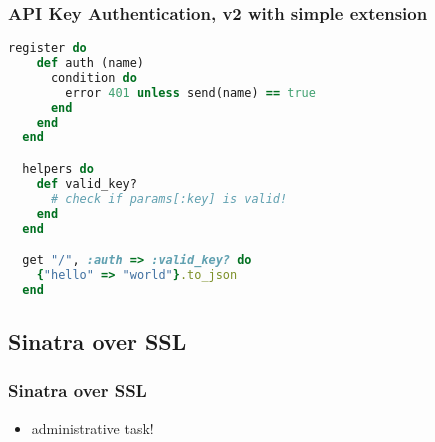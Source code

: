 \documentclass{beamer}
\begin{document}
\begin{frame}[fragile]\frametitle{API Key Authentication, v2 with simple extension} 

  \begin{lstlisting}[language=ruby, escapechar={^}]
  register do
    def auth (name)
      condition do
        error 401 unless send(name) == true
      end
    end
  end

  helpers do
    def valid_key?
      # check if params[:key] is valid!
    end
  end

  get "/", :auth => :valid_key? do
    {"hello" => "world"}.to_json
  end
  \end{lstlisting}

\end{frame}




\subsection{Sinatra over SSL}
\begin{frame}[fragile]\frametitle{Sinatra over SSL} 

  

  
  
  \begin{itemize}
    \item administrative task!
  \end{itemize}
  
\end{frame}
\end{document}
